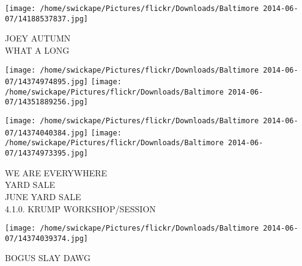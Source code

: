 \documentclass[10pt,letterpaper]{article}
\begin{document}
\vspace{0.25in}
\texttt{[image: /home/swickape/Pictures/flickr/Downloads/Baltimore 2014-06-07/14188537837.jpg]}

JOEY AUTUMN\\
WHAT A LONG
\pagebreak

\texttt{[image: /home/swickape/Pictures/flickr/Downloads/Baltimore 2014-06-07/14374974895.jpg]}
\texttt{[image: /home/swickape/Pictures/flickr/Downloads/Baltimore 2014-06-07/14351889256.jpg]}

\texttt{[image: /home/swickape/Pictures/flickr/Downloads/Baltimore 2014-06-07/14374040384.jpg]}
\texttt{[image: /home/swickape/Pictures/flickr/Downloads/Baltimore 2014-06-07/14374973395.jpg]}

WE ARE EVERYWHERE\\
YARD SALE\\
JUNE YARD SALE\\
4.1.0. KRUMP WORKSHOP/SESSION
\pagebreak

\texttt{[image: /home/swickape/Pictures/flickr/Downloads/Baltimore 2014-06-07/14374039374.jpg]}

BOGUS SLAY DAWG
\pagebreak
\end{document}
